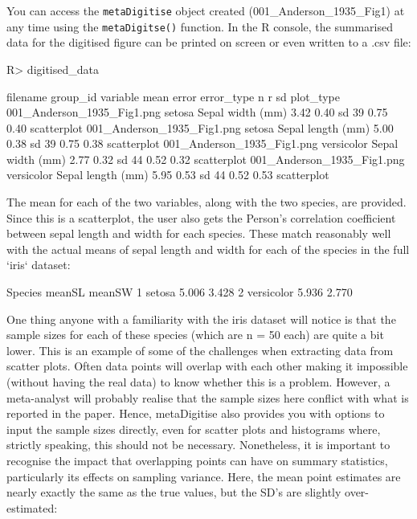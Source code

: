\documentclass[12pt]{article}
\newcommand{\code}[1]{\texttt{#1}}
\newcommand{\fct}[1]{\texttt{#1()}}
\newcommand{\pkg}[1]{{\fontseries{b}\selectfont #1}}
\let\proglang=\textsf
\begin{document}
You can access the \code{metaDigitise} object created (001\_Anderson\_1935\_Fig1) at any time using the \fct{metaDigitse} function. In the \proglang{R} console, the summarised data for the digitised figure can be printed on screen or even written to a .csv file:

\begin{CodeChunk}
\begin{CodeInput}
R> digitised_data
\end{CodeInput}
{\scriptsize
\begin{CodeOutput}
                  filename    group_id         variable  mean  error error_type  n     r    sd  plot_type
001_Anderson_1935_Fig1.png      setosa  Sepal width (mm)  3.42  0.40  sd        39  0.75  0.40  scatterplot
001_Anderson_1935_Fig1.png      setosa  Sepal length (mm) 5.00  0.38  sd        39  0.75  0.38  scatterplot
001_Anderson_1935_Fig1.png  versicolor  Sepal width (mm)  2.77  0.32  sd        44  0.52  0.32  scatterplot
001_Anderson_1935_Fig1.png  versicolor  Sepal length (mm) 5.95  0.53  sd        44  0.52  0.53  scatterplot
\end{CodeOutput}
}
\end{CodeChunk}

The mean for each of the two variables, along with the two species, are provided. Since this is a scatterplot, the user also gets the Person's correlation coefficient between sepal length and width for each species. These match reasonably well with the actual means of sepal length and width for each of the species in the full `iris` dataset:

\begin{CodeChunk}
\begin{CodeOutput}
     Species meanSL meanSW
1     setosa  5.006  3.428
2 versicolor  5.936  2.770
\end{CodeOutput}
\end{CodeChunk}

One thing anyone with a familiarity with the iris dataset will notice is that the sample sizes for each of these species (which are n = 50 each) are quite a bit lower. This is an example of some of the challenges when extracting data from scatter plots. Often data points will overlap with each other making it impossible (without having the real data) to know whether this is a problem. However, a meta-analyst will probably realise that the sample sizes here conflict with what is reported in the paper. Hence, \pkg{metaDigitise} also provides you with  options to input the sample sizes directly, even for scatter plots and histograms where, strictly speaking, this should not be necessary. Nonetheless, it is important to recognise the impact that overlapping points can have on summary statistics, particularly its effects on sampling variance. Here, the mean point estimates are nearly exactly the same as the true values, but the SD's are slightly over-estimated:
\end{document}
